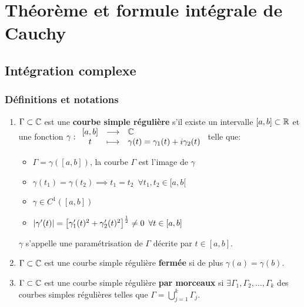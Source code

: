 \chapter{Théorème et formule intégrale de Cauchy}


\section{Intégration complexe}

\subsection{Définitions et notations}

\begin{definition}[10.1, p.73]\hfill
\begin{enumerate}[label=\arabic{enumi})]
    \item
    $\Gamma \subset \mathbb{C}$ est une \textbf{courbe simple régulière} s'il existe un intervalle $[a,b] \subset \mathbb{R}$ et une fonction $\gamma: \begin{array}{ccl} [a,b] & \longrightarrow & \mathbb{C}\\ t & \longmapsto & \gamma(t) = \gamma_1(t) + i\gamma_2(t)\end{array}$ telle que:
    
    \begin{itemize}
    \item $\Gamma = \gamma([a,b])$, la courbe $\Gamma$ est l'image de $\gamma$
    \item $\gamma(t_1) = \gamma(t_2) \implies t_1 = t_2 \enspace \forall t_1,t_2 \in [a,b[$
    \item $\gamma \in C^1\left([a,b]\right)$
    \item $\left|\gamma'(t)\right| = \left[\gamma_1'(t)^2 + \gamma_2'(t)^2\right]^\frac{1}{2} \neq 0 \enspace \forall t \in [a,b]$
    \end{itemize}

    $\gamma$ s'appelle une paramétrisation de $\Gamma$ décrite par $t \in [a,b]$.
    
    \item
    $\Gamma \subset \mathbb{C}$ est une courbe simple régulière \textbf{fermée} si de plus $\gamma(a) = \gamma(b)$.
    
    \item
    $\Gamma \subset \mathbb{C}$ est une courbe simple régulière \textbf{par morceaux} si $\exists \Gamma_1, \Gamma_2,\ldots,\Gamma_k$ des courbes simples régulières telles que $\Gamma = \bigcup\limits_{j = 1}^k \Gamma_j$.
    

\end{enumerate}
\end{definition}
